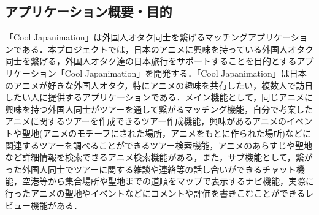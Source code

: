\subsection{アプリケーション概要・目的}
\par
「Cool Japanimation」は外国人オタク同士を繋げるマッチングアプリケーションである．本プロジェクトでは，日本のアニメに興味を持っている外国人オタク同士を繋げる，外国人オタク達の日本旅行をサポートすることを目的とするアプリケーション「Cool Japanimation」を開発する．「Cool Japanimation」は日本のアニメが好きな外国人オタク，特にアニメの趣味を共有したい，複数人で訪日したい人に提供するアプリケーションである．メイン機能として，同じアニメに興味を持つ外国人同士がツアーを通して繋がるマッチング機能，自分で考案したアニメに関するツアーを作成できるツアー作成機能，興味があるアニメのイベントや聖地(アニメのモチーフにされた場所，アニメをもとに作られた場所)などに関連するツアーを調べることができるツアー検索機能，アニメのあらすじや聖地など詳細情報を検索できるアニメ検索機能がある，また，サブ機能として，繋がった外国人同士でツアーに関する雑談や連絡等の話し合いができるチャット機能，空港等から集合場所や聖地までの道順をマップで表示するナビ機能，実際に行ったアニメの聖地やイベントなどにコメントや評価を書きこむことができるレビュー機能がある．
